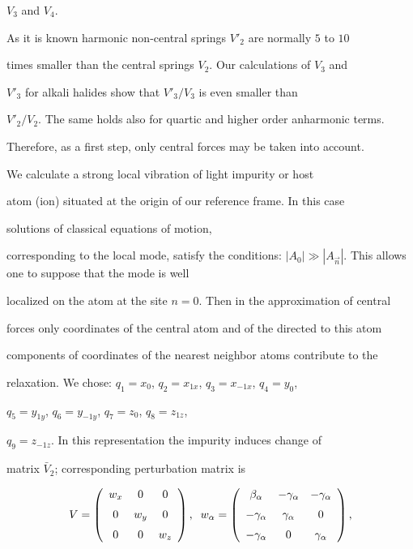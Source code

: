 $V_{3}$ and $V_{4}$. 



As it is known harmonic non-central springs $V'_2$ are normally $5$ to $10$ 

times smaller than the central springs $V_2$. Our calculations of $V_3$ and 

$V'_3$ for alkali halides show that $V'_3/V_3$ is even smaller than 

$V'_2/V_2$. The same holds also for quartic and higher order anharmonic terms.

Therefore, as a first step, only central forces may 
be taken into account.


We calculate a strong local vibration of light impurity or host 

atom (ion) situated at the origin of our reference frame. In this case 

solutions of classical equations of motion, 

corresponding to the local mode, satisfy the conditions:
$|A_{0}| \gg |A_{\vec{n}}|$. This allows one to suppose that the mode is well 

localized on the atom at the site $n=0$. Then in the approximation of central 

forces only coordinates of the central atom and of the directed to this atom 

components of coordinates of the nearest neighbor atoms contribute to the 

relaxation. We chose:
${q}_1 = {x}_0$, ${q}_2 = {x}_{1x}$, ${q}_3 = {x}_{-1x}$, ${q}_4 = {y}_0$, 

${q}_5 = {y}_{1y}$, ${q}_6 = {y}_{-1y}$, ${q}_7 = {z}_0$, ${q}_8 = {z}_{1z}$, 

${q}_9 = {z}_{-1z}$. In this representation the impurity induces change of 

matrix $\bar{V}_2$; corresponding perturbation matrix is 

\[ V = \left (\begin{array}{ccc} 

w_x&0&0\\\noalign{\medskip} 

0&w_y&0\\\noalign{\medskip} 

0&0&w_z\end{array} 

\right ) , \;\; 

w_{\alpha} = \left (\begin{array}{ccc} 

\beta_{\alpha}&-\gamma_{\alpha}&-\gamma_{\alpha}\\\noalign{\medskip} 

-\gamma_{\alpha}&\gamma_{\alpha}&0\\\noalign{\medskip} 

-\gamma_{\alpha}&0&\gamma_{\alpha}\end{array} 

\right ) , \] 

